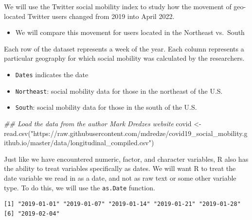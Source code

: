 \documentclass[
  letterpaper,
  DIV=11,
  numbers=noendperiod]{scrreprt}
\newenvironment{Shaded}{\begin{snugshade}}{\end{snugshade}}
\newcommand{\DocumentationTok}[1]{\textcolor[rgb]{0.37,0.37,0.37}{\textit{#1}}}
\newcommand{\FunctionTok}[1]{\textcolor[rgb]{0.28,0.35,0.67}{#1}}
\newcommand{\NormalTok}[1]{\textcolor[rgb]{0.00,0.23,0.31}{#1}}
\newcommand{\OtherTok}[1]{\textcolor[rgb]{0.00,0.23,0.31}{#1}}
\newcommand{\SpecialCharTok}[1]{\textcolor[rgb]{0.37,0.37,0.37}{#1}}
\newcommand{\StringTok}[1]{\textcolor[rgb]{0.13,0.47,0.30}{#1}}
\providecommand{\tightlist}{%
  \setlength{\itemsep}{0pt}\setlength{\parskip}{0pt}}\usepackage{longtable,booktabs,array}
\begin{document}
We will use the Twitter social mobility index to study how the movement
of geo-located Twitter users changed from 2019 into April 2022.

\begin{itemize}
\tightlist
\item
  We will compare this movement for users located in the Northeast
  vs.~South
\end{itemize}

Each row of the dataset represents a week of the year. Each column
represents a particular geography for which social mobility was
calculated by the researchers.

\begin{itemize}
\tightlist
\item
  \texttt{Dates} indicates the date
\item
  \texttt{Northeast}: social mobility data for those in the northeast of
  the U.S.
\item
  \texttt{South}: social mobility data for those in the south of the
  U.S.
\end{itemize}

\begin{Shaded}
\begin{Highlighting}[]
\DocumentationTok{\#\# Load the data from the author Mark Dredze\textquotesingle{}s website}
\NormalTok{covid }\OtherTok{\textless{}{-}} \FunctionTok{read.csv}\NormalTok{(}\StringTok{"https://raw.githubusercontent.com/mdredze/covid19\_social\_mobility.github.io/master/data/longitudinal\_compiled.csv"}\NormalTok{)}
\end{Highlighting}
\end{Shaded}

Just like we have encountered numeric, factor, and character variables,
R also has the ability to treat variables specifically as dates. We will
want R to treat the date variable we read in as a date, and not as raw
text or some other variable type. To do this, we will use the
\texttt{as.Date} function.

\begin{Shaded}
\end{Shaded}

\begin{verbatim}
[1] "2019-01-01" "2019-01-07" "2019-01-14" "2019-01-21" "2019-01-28"
[6] "2019-02-04"
\end{verbatim}
\end{document}
